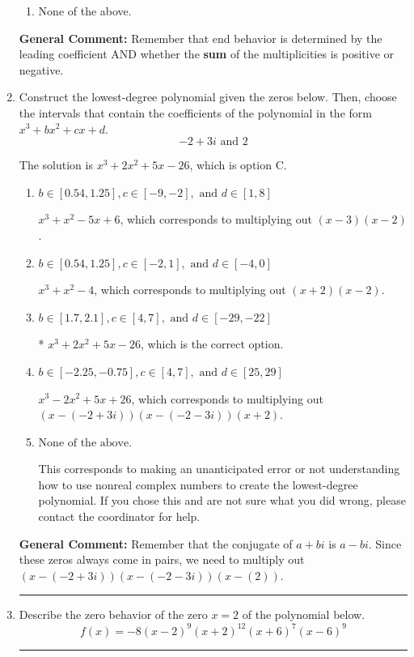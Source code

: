 \documentclass{extbook}[14pt]
\newcommand{\litem}[1]{\item #1

\rule{\textwidth}{0.4pt}}
\begin{document}
\begin{enumerate}
{\begin{enumerate}[label=\Alph*.]
\begin{multicols}{2}
\end{multicols}\item None of the above.\end{enumerate}
\textbf{General Comment:} Remember that end behavior is determined by the leading coefficient AND whether the \textbf{sum} of the multiplicities is positive or negative.
}
\litem{
Construct the lowest-degree polynomial given the zeros below. Then, choose the intervals that contain the coefficients of the polynomial in the form $x^3+bx^2+cx+d$.
\[ -2 + 3 i \text{ and } 2 \]

The solution is \( x^{3} +2 x^{2} +5 x -26 \), which is option C.\begin{enumerate}[label=\Alph*.]
\item \( b \in [0.54, 1.25], c \in [-9, -2], \text{ and } d \in [1, 8] \)

$x^{3} + x^{2} -5 x + 6$, which corresponds to multiplying out $(x -3)(x -2)$.
\item \( b \in [0.54, 1.25], c \in [-2, 1], \text{ and } d \in [-4, 0] \)

$x^{3} + x^{2} -4$, which corresponds to multiplying out $(x + 2)(x -2)$.
\item \( b \in [1.7, 2.1], c \in [4, 7], \text{ and } d \in [-29, -22] \)

* $x^{3} +2 x^{2} +5 x -26$, which is the correct option.
\item \( b \in [-2.25, -0.75], c \in [4, 7], \text{ and } d \in [25, 29] \)

$x^{3} -2 x^{2} +5 x + 26$, which corresponds to multiplying out $(x-(-2 + 3 i))(x-(-2 - 3 i))(x + 2)$.
\item \( \text{None of the above.} \)

This corresponds to making an unanticipated error or not understanding how to use nonreal complex numbers to create the lowest-degree polynomial. If you chose this and are not sure what you did wrong, please contact the coordinator for help.
\end{enumerate}

\textbf{General Comment:} Remember that the conjugate of $a+bi$ is $a-bi$. Since these zeros always come in pairs, we need to multiply out $(x-(-2 + 3 i))(x-(-2 - 3 i))(x-(2))$.
}
\litem{
Describe the zero behavior of the zero $x = 2$ of the polynomial below.
\[ f(x) = -8(x - 2)^{9}(x + 2)^{12}(x + 6)^{7}(x - 6)^{9} \]

}
\end{enumerate}
\end{document}
